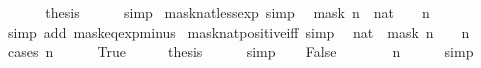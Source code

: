 \begin{isabellebody}
\ \ \isamarkupfalse%
\ {\isacharasterisk}{\kern0pt}\ \isamarkupfalse%
\ {\isacharquery}{\kern0pt}thesis\isanewline
\ \ \ \ \isamarkupfalse%
\ simp\isanewline
{}\isamarkupfalse%
%
\endisatagproof
{\isafoldproof}%
%
\isadelimproof
\isanewline
%
\endisadelimproof
\isanewline
{}\isamarkupfalse%
\ mask{\isacharunderscore}{\kern0pt}nat{\isacharunderscore}{\kern0pt}less{\isacharunderscore}{\kern0pt}exp\ {\isacharbrackleft}{\kern0pt}simp{\isacharbrackright}{\kern0pt}{\isacharcolon}{\kern0pt}\isanewline
\ \ {\isacartoucheopen}{\isacharparenleft}{\kern0pt}mask\ n\ {\isacharcolon}{\kern0pt}{\isacharcolon}{\kern0pt}\ nat{\isacharparenright}{\kern0pt}\ {\isacharless}{\kern0pt}\ {}\ {\isacharcircum}{\kern0pt}\ n{\isacartoucheclose}\isanewline
%
\isadelimproof
\ \ %
\endisadelimproof
%
\isatagproof
{}\isamarkupfalse%
\ {\isacharparenleft}{\kern0pt}simp\ add{\isacharcolon}{\kern0pt}\ mask{\isacharunderscore}{\kern0pt}eq{\isacharunderscore}{\kern0pt}exp{\isacharunderscore}{\kern0pt}minus{\isacharunderscore}{\kern0pt}{}{\isacharparenright}{\kern0pt}%
\endisatagproof
{\isafoldproof}%
%
\isadelimproof
\isanewline
%
\endisadelimproof
\isanewline
{}\isamarkupfalse%
\ mask{\isacharunderscore}{\kern0pt}nat{\isacharunderscore}{\kern0pt}positive{\isacharunderscore}{\kern0pt}iff\ {\isacharbrackleft}{\kern0pt}simp{\isacharbrackright}{\kern0pt}{\isacharcolon}{\kern0pt}\isanewline
\ \ {\isacartoucheopen}{\isacharparenleft}{\kern0pt}{}{\isacharcolon}{\kern0pt}{\isacharcolon}{\kern0pt}nat{\isacharparenright}{\kern0pt}\ {\isacharless}{\kern0pt}\ mask\ n\ {\isasymlongleftrightarrow}\ {}\ {\isacharless}{\kern0pt}\ n{\isacartoucheclose}\isanewline
%
\isadelimproof
%
\endisadelimproof
%
\isatagproof
{}\isamarkupfalse%
\ {\isacharparenleft}{\kern0pt}cases\ {\isacartoucheopen}n\ {\isacharequal}{\kern0pt}\ {}{\isacartoucheclose}{\isacharparenright}{\kern0pt}\isanewline
\ \ \isamarkupfalse%
\ True\isanewline
\ \ \isamarkupfalse%
\ \isamarkupfalse%
\ {\isacharquery}{\kern0pt}thesis\isanewline
\ \ \ \ \isamarkupfalse%
\ simp\isanewline
{}\isamarkupfalse%
\isanewline
\ \ \isamarkupfalse%
\ False\isanewline
\ \ \isamarkupfalse%
\ \isamarkupfalse%
\ {\isacartoucheopen}{}\ {\isacharless}{\kern0pt}\ n{\isacartoucheclose}\isanewline
\ \ \ \ \isamarkupfalse%
\ simp\isanewline

\end{isabellebody}
